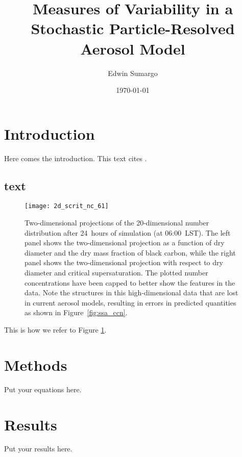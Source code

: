 \documentclass{article}
\begin{document}
\title{Measures of Variability in a Stochastic Particle-Resolved Aerosol Model}
\author{Edwin Sumargo}
\date{\today}
\maketitle

\section{Introduction}
Here comes the introduction. This text cites \citet{Murphy2006}.
\subsection{text}

\begin{figure}
  \begin{center}
    \texttt{[image: 2d\_scrit\_nc\_61]}
  \end{center}
  \caption{\label{fig:2d_scrit_nc_61} Two-dimensional projections of
    the 20-dimensional number distribution after 24~hours of
    simulation (at 06:00~LST). The left panel shows the
    two-dimensional projection as a function of dry diameter and the
    dry mass fraction of black carbon, while the right panel shows the
    two-dimensional projection with respect to dry diameter and
    critical supersaturation. The plotted number concentrations have
    been capped to better show the features in the data. Note the
    structures in this high-dimensional data that are lost in current
    aerosol models, resulting in errors in predicted quantities as
    shown in Figure~\ref{fig:ssa_ccn}.}
\end{figure}

This is how we refer to Figure \ref{fig:2d_scrit_nc_61}.

\section{Methods}
Put your equations here.
\section{Results}
Put your results here.



\end{document}
